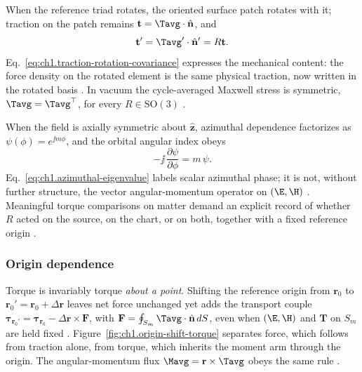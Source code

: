 When the reference triad rotates, the oriented surface patch rotates with it; traction on the patch remains $\mathbf{t}=\Tavg\cdot\hat{\mathbf{n}}$, and
\begin{equation}
\label{eq:ch1.traction-rotation-covariance}
\mathbf{t}'=\Tavg'\cdot\hat{\mathbf{n}}' = R\mathbf{t}.
\end{equation}
Eq.~\eqref{eq:ch1.traction-rotation-covariance} expresses the mechanical content: the force density on the rotated element is the same physical traction, now written in the rotated basis \cite{beth1936}. In vacuum the cycle-averaged Maxwell stress is symmetric, $\Tavg=\Tavg^\top$, for every $R\in\mathrm{SO}(3)$ \cite{maxwell1873}.

When the field is axially symmetric about \(\hat{\mathbf{z}}\), azimuthal dependence factorizes as \(\psi(\phi)=e^{\jj m\phi}\), and the orbital angular index obeys
\begin{equation}
\label{eq:ch1.azimuthal-eigenvalue}
-\jj\,\frac{\partial\psi}{\partial\phi}=m\,\psi.
\end{equation}
Eq.~\eqref{eq:ch1.azimuthal-eigenvalue} labels scalar azimuthal phase; it is not, without further structure, the vector angular-momentum operator on $(\E,\H)$ \cite{stratton1941}. Meaningful torque comparisons on matter demand an explicit record of whether $R$ acted on the source, on the chart, or on both, together with a fixed reference origin \cite{beth1936,stratton1941}.

\label{eq:ch1.active-passive-duality}
\label{eq:ch1.tensor-invariant-trace}
\label{eq:ch1.stress-eigen-covariance}
\label{eq:ch1.rotation-group-action}
\label{eq:ch1.dyadic-covariance}
\label{eq:ch1.rank1-dyad-rotation}
\label{sec:ch01.3.2b}
\label{eq:ch1.total-angular-generator}
\label{eq:ch1.orbital-angular-generator}
\label{eq:ch1.spin-angular-generator}
\label{eq:ch1.rotation-from-generators}

\label{sec:ch01.3.3}
\subsubsection*{Origin dependence}

Torque is invariably torque \emph{about a point}. Shifting the reference origin from $\mathbf{r}_0$ to $\mathbf{r}_0'=\mathbf{r}_0+\Delta\mathbf{r}$ leaves net force unchanged yet adds the transport couple $\boldsymbol{\tau}_{\mathbf{r}_0'}=\boldsymbol{\tau}_{\mathbf{r}_0}-\Delta\mathbf{r}\times\mathbf{F}$, with $\mathbf{F}=\oint_{S_m}\Tavg\cdot\hat{\mathbf{n}}\,dS$, even when $(\E,\H)$ and $\mathbf{T}$ on $S_m$ are held fixed \cite{beth1936,stratton1941}. Figure~\ref{fig:ch1.origin-shift-torque} separates force, which follows from traction alone, from torque, which inherits the moment arm through the origin. The angular-momentum flux $\Mavg=\mathbf{r}\times\Tavg$ obeys the same rule \cite{stratton1941}.

